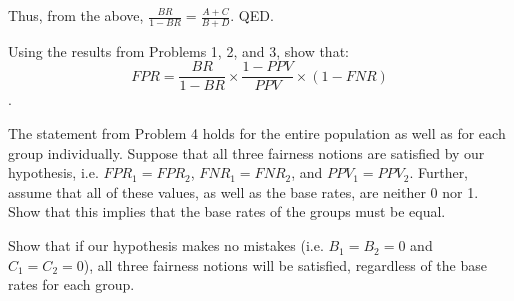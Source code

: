 \documentclass{cisXXX} %
\begin{document}
Thus, from the above, $\frac{BR}{1-BR} = \frac{A+C}{B+D}$. QED.


\HWproblem
Using the results from Problems 1, 2, and 3, show that:
$$FPR = \frac{BR}{1-BR}\times\frac{1-PPV}{PPV}\times(1 -FNR)$$
.

\HWproblem
The statement from Problem 4 holds for the entire population as well as for each group individually. Suppose that all three fairness notions are satisfied by our hypothesis, i.e. $FPR_1 = FPR_2$, $FNR_1 = FNR_2$, and $PPV_1 = PPV_2$. Further, assume that all of these values, as well as the base rates, are neither 0 nor 1. Show that this implies that the base rates of the groups must be equal.

\HWproblem
Show that if our hypothesis makes no mistakes (i.e. $B_1 = B_2 = 0$ and $C_1 = C_2 = 0$), all three fairness notions will be satisfied, regardless of the base rates for each group.
\end{document}
